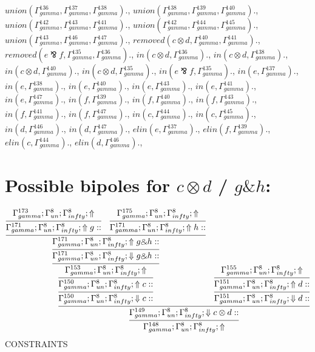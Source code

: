 \documentclass[a4paper, 11pt]{article}
\begin{document}
$union(\Gamma_{gamma}^{136}, \Gamma_{gamma}^{137}, \Gamma_{gamma}^{138}).$, $union(\Gamma_{gamma}^{138}, \Gamma_{gamma}^{139}, \Gamma_{gamma}^{140}).$, $union(\Gamma_{gamma}^{142}, \Gamma_{gamma}^{143}, \Gamma_{gamma}^{141}).$, $union(\Gamma_{gamma}^{142}, \Gamma_{gamma}^{144}, \Gamma_{gamma}^{145}).$, $union(\Gamma_{gamma}^{143}, \Gamma_{gamma}^{146}, \Gamma_{gamma}^{147}).$, $removed(c \otimes d, \Gamma_{gamma}^{140}, \Gamma_{gamma}^{141}).$, $removed(e \bindnasrepma f, \Gamma_{gamma}^{135}, \Gamma_{gamma}^{136}).$, $in(c \otimes d, \Gamma_{gamma}^{136}).$, $in(c \otimes d, \Gamma_{gamma}^{138}).$, $in(c \otimes d, \Gamma_{gamma}^{140}).$, $in(c \otimes d, \Gamma_{gamma}^{135}).$, $in(e \bindnasrepma f, \Gamma_{gamma}^{135}).$, $in(e, \Gamma_{gamma}^{137}).$, $in(e, \Gamma_{gamma}^{138}).$, $in(e, \Gamma_{gamma}^{140}).$, $in(e, \Gamma_{gamma}^{143}).$, $in(e, \Gamma_{gamma}^{141}).$, $in(e, \Gamma_{gamma}^{147}).$, $in(f, \Gamma_{gamma}^{139}).$, $in(f, \Gamma_{gamma}^{140}).$, $in(f, \Gamma_{gamma}^{143}).$, $in(f, \Gamma_{gamma}^{141}).$, $in(f, \Gamma_{gamma}^{147}).$, $in(c, \Gamma_{gamma}^{144}).$, $in(c, \Gamma_{gamma}^{145}).$, $in(d, \Gamma_{gamma}^{146}).$, $in(d, \Gamma_{gamma}^{147}).$, $elin(e, \Gamma_{gamma}^{137}).$, $elin(f, \Gamma_{gamma}^{139}).$, $elin(c, \Gamma_{gamma}^{144}).$, $elin(d, \Gamma_{gamma}^{146}).$,


\section{Possible bipoles for $c \otimes d$ / $g \binampersand h$:} 

{\small
\[
\infer{\Gamma_{ gamma}^{148} ; \Gamma_{un}^{8} ; \Gamma_{ infty}^{8} ;  \Uparrow }
{\infer{\Gamma_{ gamma}^{149} ; \Gamma_{un}^{8} ; \Gamma_{ infty}^{8} ;  \Downarrow c \otimes d :: }
{\infer{\Gamma_{ gamma}^{150} ; \Gamma_{un}^{8} ; \Gamma_{ infty}^{8} ;  \Downarrow c :: }
{\infer{\Gamma_{ gamma}^{150} ; \Gamma_{un}^{8} ; \Gamma_{ infty}^{8} ;  \Uparrow c :: }
{\infer{\Gamma_{ gamma}^{153} ; \Gamma_{un}^{8} ; \Gamma_{ infty}^{8} ;  \Uparrow }
{\infer{\Gamma_{ gamma}^{171} ; \Gamma_{un}^{8} ; \Gamma_{ infty}^{8} ;  \Downarrow g \binampersand h :: }
{\infer{\Gamma_{ gamma}^{171} ; \Gamma_{un}^{8} ; \Gamma_{ infty}^{8} ;  \Uparrow g \binampersand h :: }
{\infer{\Gamma_{ gamma}^{171} ; \Gamma_{un}^{8} ; \Gamma_{ infty}^{8} ;  \Uparrow g :: }
{\Gamma_{ gamma}^{173} ; \Gamma_{un}^{8} ; \Gamma_{ infty}^{8} ;  \Uparrow }
&
\infer{\Gamma_{ gamma}^{171} ; \Gamma_{un}^{8} ; \Gamma_{ infty}^{8} ;  \Uparrow h :: }
{\Gamma_{ gamma}^{175} ; \Gamma_{un}^{8} ; \Gamma_{ infty}^{8} ;  \Uparrow }}}}}}
&
\infer{\Gamma_{ gamma}^{151} ; \Gamma_{un}^{8} ; \Gamma_{ infty}^{8} ;  \Downarrow d :: }
{\infer{\Gamma_{ gamma}^{151} ; \Gamma_{un}^{8} ; \Gamma_{ infty}^{8} ;  \Uparrow d :: }
{\Gamma_{ gamma}^{155} ; \Gamma_{un}^{8} ; \Gamma_{ infty}^{8} ;  \Uparrow }}}}
\]
}
CONSTRAINTS
\end{document}
